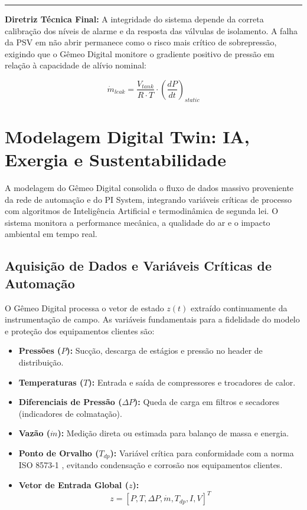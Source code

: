 \documentclass[12pt,a4paper]{article}
\numberwithin{equation}{section}
\numberwithin{table}{section}
\numberwithin{figure}{section}
\begin{document}
\vspace{1em}
\hrule
\vspace{1em}

\textbf{Diretriz Técnica Final:} A integridade do sistema depende da correta calibração dos níveis de alarme e da resposta das válvulas de isolamento. A falha da PSV em não abrir permanece como o risco mais crítico de sobrepressão, exigindo que o Gêmeo Digital monitore o gradiente positivo de pressão em relação à capacidade de alívio nominal:

\begin{equation}\label{eq:s16-7}
\boxed{\dot{m}_{leak} = \frac{V_{tank}}{R \cdotp T} \cdotp \left( \frac{dP}{dt} \right)_{static}}
\end{equation}



\section{Modelagem Digital Twin: IA, Exergia e Sustentabilidade}

A modelagem do Gêmeo Digital consolida o fluxo de dados massivo proveniente da rede de automação e do PI System, integrando variáveis críticas de processo com algoritmos de Inteligência Artificial e termodinâmica de segunda lei. O sistema monitora a performance mecânica, a qualidade do ar e o impacto ambiental em tempo real.

\subsection{Aquisição de Dados e Variáveis Críticas de Automação}

O Gêmeo Digital processa o vetor de estado $z(t)$ extraído continuamente da instrumentação de campo. As variáveis fundamentais para a fidelidade do modelo e proteção dos equipamentos clientes são:

\begin{itemize}
	\item \textbf{Pressões ($P$):} Sucção, descarga de estágios e pressão no header de distribuição.
	\item \textbf{Temperaturas ($T$):} Entrada e saída de compressores e trocadores de calor.
	\item \textbf{Diferenciais de Pressão ($\Delta P$):} Queda de carga em filtros e secadores (indicadores de colmatação).
	\item \textbf{Vazão ($\dot{m}$):} Medição direta ou estimada para balanço de massa e energia.
	\item \textbf{Ponto de Orvalho ($T_{dp}$):} Variável crítica para conformidade com a norma ISO 8573-1 \cite{iso8573}, evitando condensação e corrosão nos equipamentos clientes.
	\item \textbf{Vetor de Entrada Global ($z$):}
	\begin{equation}\label{eq:s17-1}
z = [P, T, \Delta P, \dot{m}, T_{dp}, I, V]^T
\end{equation}
\end{itemize}
\end{document}
